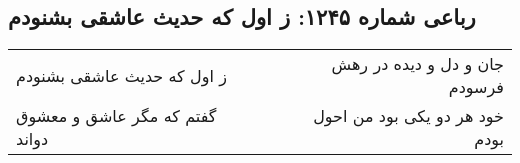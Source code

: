 \begin{center}
\section*{رباعی شماره ۱۲۴۵: ز اول که حدیث عاشقی بشنودم}
\label{sec:1245}
\begin{longtable}{l p{0.5cm} r}
ز اول که حدیث عاشقی بشنودم
&&
جان و دل و دیده در رهش فرسودم
\\
گفتم که مگر عاشق و معشوق دواند
&&
خود هر دو یکی بود من احول بودم
\\
\end{longtable}
\end{center}
